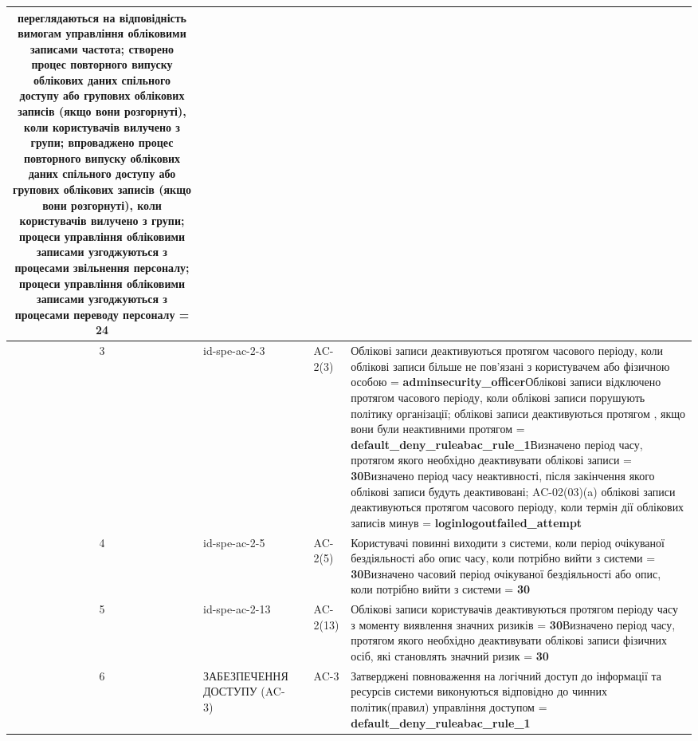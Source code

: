 \documentclass[10pt]{article}
\begin{document}
\begin{longtable}{|c|>{\raggedright\arraybackslash}p{4cm}|>{\raggedright\arraybackslash}p{2.5cm}|>{\raggedright\arraybackslash}p{3.5cm}|>{\raggedright\arraybackslash}p{5.5cm}|}
переглядаються на відповідність вимогам управління обліковими записами частота; створено процес повторного випуску облікових даних спільного доступу або групових облікових записів (якщо вони розгорнуті), коли користувачів вилучено з групи; впроваджено процес повторного випуску облікових даних спільного доступу або групових облікових записів (якщо вони розгорнуті), коли користувачів вилучено з групи; процеси управління обліковими записами узгоджуються з процесами звільнення персоналу; процеси управління обліковими записами узгоджуються з процесами переводу персоналу = \textbf{24} \\ \hline
3 & id-spe-ac-2-3 &  & AC-2(3) & Облікові записи деактивуються протягом часового періоду, коли облікові записи більше не пов'язані з користувачем або фізичною особою = \textbf{adminsecurity\_\allowbreak{}officer}\newline Облікові записи відключено протягом часового періоду, коли облікові записи порушують політику організації; облікові записи деактивуються протягом , якщо вони були неактивними протягом  = \textbf{default\_\allowbreak{}deny\_\allowbreak{}ruleabac\_\allowbreak{}rule\_\allowbreak{}1}\newline Визначено період часу, протягом якого необхідно деактивувати облікові записи = \textbf{30}\newline Визначено період часу неактивності, після закінчення якого облікові записи будуть деактивовані; AC-02(03)(a) облікові записи деактивуються протягом часового періоду, коли термін дії облікових записів минув = \textbf{loginlogoutfailed\_\allowbreak{}attempt} \\ \hline
4 & id-spe-ac-2-5 &  & AC-2(5) & Користувачі повинні виходити з системи, коли період очікуваної бездіяльності або опис часу, коли потрібно вийти з системи = \textbf{30}\newline Визначено часовий період очікуваної бездіяльності або опис, коли потрібно вийти з системи = \textbf{30} \\ \hline
5 & id-spe-ac-2-13 &  & AC-2(13) & Облікові записи користувачів деактивуються протягом періоду часу з моменту виявлення значних ризиків = \textbf{30}\newline Визначено період часу, протягом якого необхідно деактивувати облікові записи фізичних осіб, які становлять значний ризик = \textbf{30} \\ \hline
6 & ЗАБЕЗПЕЧЕННЯ ДОСТУПУ (AC-3) &  & AC-3 & Затверджені повноваження на логічний доступ до інформації та ресурсів системи виконуються відповідно до чинних політик(правил) управління доступом = \textbf{default\_\allowbreak{}deny\_\allowbreak{}ruleabac\_\allowbreak{}rule\_\allowbreak{}1} \\ \hline

\end{longtable}
\end{document}
